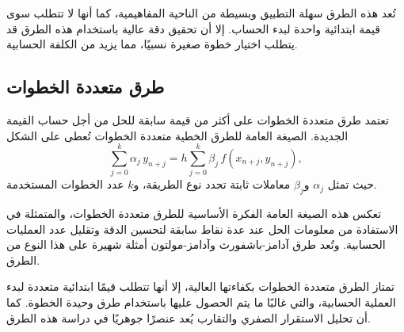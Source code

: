 تُعد هذه الطرق سهلة التطبيق وبسيطة من الناحية المفاهيمية، كما أنها لا تتطلب سوى قيمة ابتدائية واحدة لبدء الحساب. إلا أن تحقيق دقة عالية باستخدام هذه الطرق قد يتطلب اختيار خطوة صغيرة نسبيًا، مما يزيد من الكلفة الحسابية.

\subsection{طرق متعددة الخطوات}
تعتمد طرق متعددة الخطوات على أكثر من قيمة سابقة للحل من أجل حساب القيمة الجديدة. الصيغة العامة للطرق الخطية متعددة الخطوات تُعطى على الشكل
\[
\sum_{j=0}^{k} \alpha_j \, y_{n+j}
=
h \sum_{j=0}^{k} \beta_j \, f(x_{n+j}, y_{n+j}),
\]
حيث تمثل \(\alpha_j\) و\(\beta_j\) معاملات ثابتة تحدد نوع الطريقة، و\(k\) عدد الخطوات المستخدمة.

تعكس هذه الصيغة العامة الفكرة الأساسية للطرق متعددة الخطوات، والمتمثلة في الاستفادة من معلومات الحل عند عدة نقاط سابقة لتحسين الدقة وتقليل عدد العمليات الحسابية. وتُعد طرق آدامز-باشفورث وآدامز-مولتون أمثلة شهيرة على هذا النوع من الطرق.

تمتاز الطرق متعددة الخطوات بكفاءتها العالية، إلا أنها تتطلب قيمًا ابتدائية متعددة لبدء العملية الحسابية، والتي غالبًا ما يتم الحصول عليها باستخدام طرق وحيدة الخطوة. كما أن تحليل الاستقرار الصفري والتقارب يُعد عنصرًا جوهريًا في دراسة هذه الطرق.
